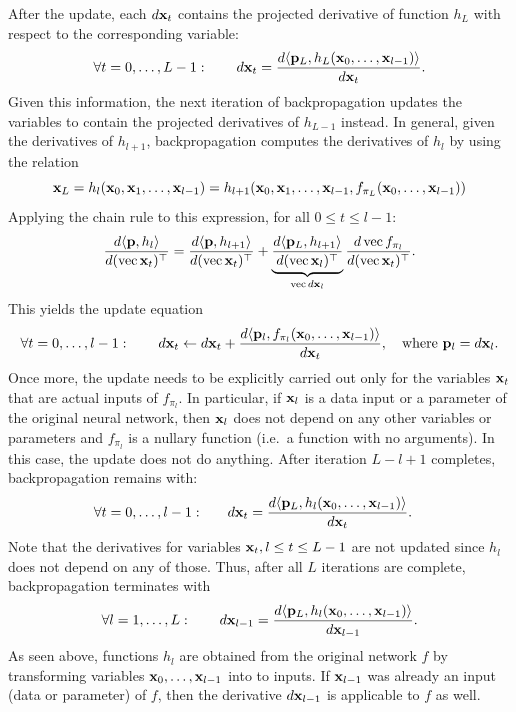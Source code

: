 After the update, each $d\mathbf{x}_t$ contains the projected derivative of function $h_L$ with respect to the corresponding variable:
\[
\forall t=0,\dots,L-1:\qquad
d\mathbf{x}_t = \frac{d\langle \mathbf{p}_L, h_L(\mathbf{x}_0,\dots,\mathbf{x}_{l-1})\rangle}{d\mathbf{x}_t}.
\]
Given this information, the next iteration of backpropagation updates the variables to contain the projected derivatives of $h_{L-1}$ instead. In general, given the derivatives of $h_{l+1}$, backpropagation computes the derivatives of $h_{l}$ by using the relation
\[
\mathbf{x}_L
= 
h_{l}(\mathbf{x}_0,\mathbf{x}_1,\dots,\mathbf{x}_{l-1})
=
h_{l+1}(\mathbf{x}_0,\mathbf{x}_1,\dots,\mathbf{x}_{l-1},f_{\pi_L}(\mathbf{x}_0,\dots,\mathbf{x}_{l-1}))
\]
Applying the chain rule to this expression, for all $0\leq t \leq l-1$:
\[
\frac{d\langle \mathbf{p}, h_l \rangle}{d(\operatorname{vec} \mathbf{x}_t)^\top}
=
\frac{d\langle \mathbf{p}, h_{l+1}\rangle}{d(\operatorname{vec} \mathbf{x}_t)^\top}
+
\underbrace{\frac{d\langle \mathbf{p}_L, h_{l+1}\rangle}{d(\operatorname{vec} \mathbf{x}_l)^\top}}_{\operatorname{vec} d\mathbf{x}_l}
\frac{d \operatorname{vec} f_{\pi_l}}{d(\operatorname{vec} \mathbf{x}_t)^\top}.
\]
This yields the update equation
\begin{equation}\label{e:bp-update}	
\forall t=0,\dots,l-1:\qquad
d\mathbf{x}_t \leftarrow d\mathbf{x}_t + \frac{d\langle \mathbf{p}_l, f_{\pi_l}(\mathbf{x}_0,\dots,\mathbf{x}_{l-1})\rangle}{d\mathbf{x}_t},
\quad
\text{where\ }
\mathbf{p}_l = d\mathbf{x}_l.
\end{equation}
Once more, the update needs to be explicitly carried out only for the variables $\mathbf{x}_t$ that are actual inputs of $f_{\pi_l}$. In particular, if $\mathbf{x}_l$ is a data input or a parameter of the original neural network, then $\mathbf{x}_l$ does not depend on any other variables or parameters and $f_{\pi_l}$ is a nullary function (i.e.\ a function with no arguments). In this case, the update does not do anything. 
After iteration $L-l+1$ completes, backpropagation remains with:
\begin{align*}
\forall t=0,\dots,l-1:&\qquad
d\mathbf{x}_t
=
\frac{d\langle \mathbf{p}_L, h_l(\mathbf{x}_0,\dots,\mathbf{x}_{l-1})\rangle}{d\mathbf{x}_t}.
\end{align*}
Note that the derivatives for variables $\mathbf{x}_t, l \leq t \leq L-1$ are not updated since $h_l$ does not depend on any of those. Thus, after all $L$ iterations are complete, backpropagation terminates with
\[
\forall l=1,\dots,L:\qquad
d\mathbf{x}_{l-1}
=
\frac{d\langle \mathbf{p}_L, h_{l}(\mathbf{x}_0,\dots,\mathbf{x}_{l-1})\rangle}{d\mathbf{x}_{l-1}}.
\]
As seen above, functions $h_{l}$ are obtained from the original network $f$ by transforming variables $\mathbf{x}_0,\dots,\mathbf{x}_{l-1}$ into to inputs. If $\mathbf{x}_{l-1}$ was already an input (data or parameter) of $f$, then the derivative $d\mathbf{x}_{l-1}$ is applicable to $f$ as well.

